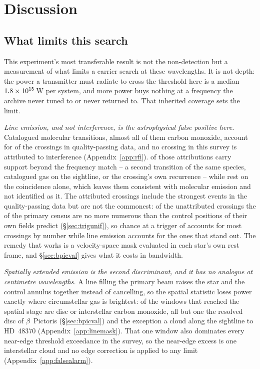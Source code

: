 \section{Discussion}
\label{sec:discussion}

\subsection{What limits this search}
\label{sec:mmdifferent}

This experiment's most transferable result is not the non-detection but a
measurement of what limits a carrier search at these wavelengths. It is not
depth: the power a transmitter must radiate to cross the threshold here is a
median $1.8\times10^{15}$\,W per system, and more power buys nothing at a
frequency the archive never tuned to or never returned to. That inherited
coverage sets the limit.

\emph{Line emission, and not interference, is the astrophysical false positive
here.} Catalogued molecular transitions, almost all of them carbon monoxide,
account for \EvNAttrQp{} of the \EvNCrossQp{} crossings in quality-passing
data, and no crossing in this survey is attributed to interference
(Appendix~\ref{app:rfi}). \LnAttrSupp{} of those attributions carry support
beyond the frequency match -- a second transition of the same species,
catalogued gas on the sightline, or the crossing's own recurrence -- while
\LnAttrCoincWord{} rest on the coincidence alone, which leaves them consistent
with molecular emission and not identified as it. The attributed crossings
include the strongest events in the quality-passing data but are not the
commonest: of the \EvNUnattrQp{} unattributed crossings the \CeObs{} of the
primary census are no more numerous than the control positions of their own
fields predict (\S\ref{sec:trigunif}), so chance at a trigger of
\StageNullTrig{} accounts for most crossings by number while line emission
accounts for the ones that stand out. The remedy that works is a
velocity-space mask evaluated in each star's own rest frame, and
\S\ref{sec:bpicval} gives what it costs in bandwidth.

\emph{Spatially extended emission is the second discriminant, and it has no
analogue at centimetre wavelengths.} A line filling the primary beam raises the
star and the control annulus together instead of cancelling, so the spatial
statistic loses power exactly where circumstellar gas is brightest:
\DiscFpWin{} of the \DiscFpOfFlags{} windows that reached the spatial stage are
disc or interstellar carbon monoxide, all but one the resolved disc of
$\beta$~Pictoris (\S\ref{sec:bpicval}) and the exception a cloud along the
sightline to HD~48370 (Appendix~\ref{app:linemask}). That one window also
dominates every near-edge threshold exceedance in the survey, so the near-edge
excess is one interstellar cloud and no edge correction is applied to any limit
(Appendix~\ref{app:falsealarm}).

